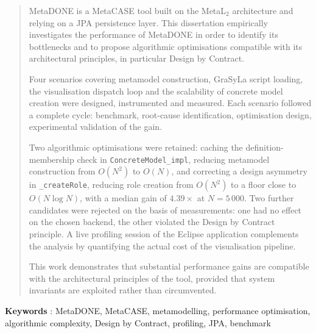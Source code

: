 \begin{quote}
MetaDONE is a MetaCASE tool built on the MetaL$_2$ architecture and relying on a JPA persistence layer. This dissertation empirically investigates the performance of MetaDONE in order to identify its bottlenecks and to propose algorithmic optimisations compatible with its architectural principles, in particular Design by Contract.

Four scenarios covering metamodel construction, GraSyLa script loading, the visualisation dispatch loop and the scalability of concrete model creation were designed, instrumented and measured. Each scenario followed a complete cycle: benchmark, root-cause identification, optimisation design, experimental validation of the gain.

Two algorithmic optimisations were retained: caching the definition-membership check in \texttt{ConcreteModel\_impl}, reducing metamodel construction from $O(N^2)$ to $O(N)$, and correcting a design asymmetry in \texttt{\_createRole}, reducing role creation from $O(N^2)$ to a floor close to $O(N \log N)$, with a median gain of $4{.}39\times$ at $N = 5\,000$. Two further candidates were rejected on the basis of measurements: one had no effect on the chosen backend, the other violated the Design by Contract principle. A live profiling session of the Eclipse application complements the analysis by quantifying the actual cost of the visualisation pipeline.

This work demonstrates that substantial performance gains are compatible with the architectural principles of the tool, provided that system invariants are exploited rather than circumvented.
\end{quote}
\bigskip
\noindent\textbf{Keywords} : MetaDONE, MetaCASE, metamodelling, performance optimisation, algorithmic complexity, Design by Contract, profiling, JPA, benchmark
